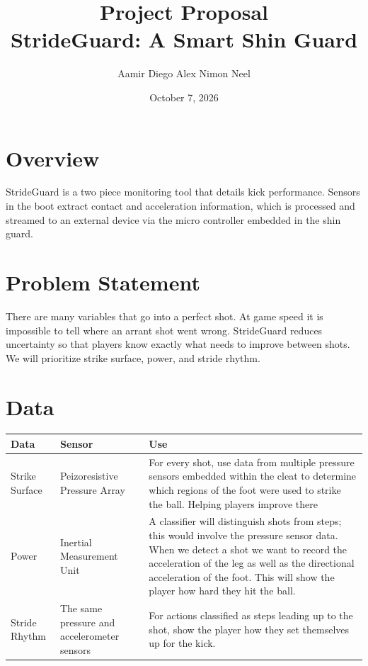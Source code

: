 \documentclass[11pt]{article}
\title{\color{UMass}\textbf{Project Proposal}\\[6pt]\large StrideGuard: A Smart Shin Guard}
\author{Aamir \quad Diego \quad Alex \quad Nimon \quad Neel}
\date{October 7, 2026}
\begin{document}
\maketitle
\thispagestyle{fancy}

\section{Overview}
StrideGuard is a two piece monitoring tool that details kick performance. Sensors in the boot extract contact and acceleration information, which is processed and streamed to an external device via the micro controller embedded in the shin guard.

\section{Problem Statement}
There are many variables that go into a perfect shot. At game speed it is impossible to tell where an arrant shot went wrong. StrideGuard reduces uncertainty so that players know exactly what needs to improve between shots. We will prioritize strike surface, power, and stride rhythm. 

\section{Data}

\begin{center}
\small
\begin{tabularx}{\textwidth}{@{}P{2.6cm}P{4.2cm}L@{}}
\toprule
\textbf{Data} & \textbf{Sensor} & \textbf{Use} \\
\midrule
Strike Surface & Peizoresistive Pressure Array &
For every shot, use data from multiple pressure sensors embedded within the cleat to determine which regions of the foot were used to strike the ball. Helping players improve there  \\
\addlinespace
Power & Inertial Measurement Unit & A classifier will distinguish shots from steps; this would involve the pressure sensor data. When we detect a shot we want to record the acceleration of the leg as well as the directional acceleration of the foot. This will show the player how hard they hit the ball. \\
\addlinespace
Stride Rhythm  & The same pressure and accelerometer sensors &
For actions classified as steps leading up to the shot, show the player how they set themselves up for the kick. \\
\bottomrule
\end{tabularx}
\end{center}
\end{document}
